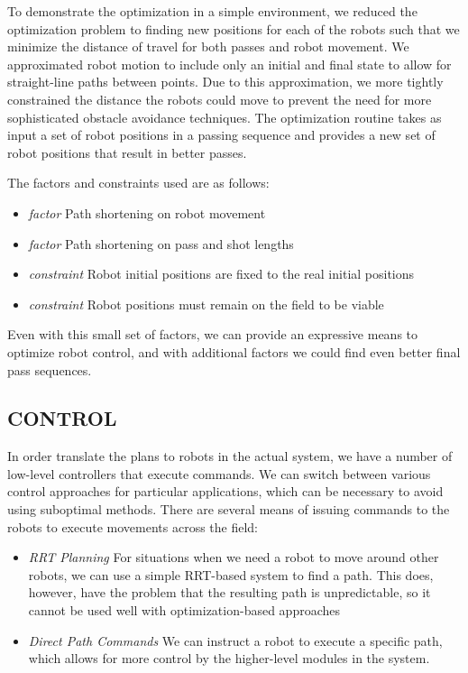 \documentclass[a4paper, 10pt, conference]{ieeeconf}      %
\begin{document}
To demonstrate the optimization in a simple environment, we reduced the optimization problem to finding new positions for each of the robots such that we minimize the distance of travel for both passes and robot movement.  We approximated robot motion to include only an initial and final state to allow for straight-line paths between points.  Due to this approximation, we more tightly constrained the distance the robots could move to prevent the need for more sophisticated obstacle avoidance techniques.  The optimization routine takes as input a set of robot positions in a passing sequence and provides a new set of robot positions that result in better passes.  

The factors and constraints used are as follows:
\begin{itemize}
 \item \textit{factor} Path shortening on robot movement
 \item \textit{factor} Path shortening on pass and shot lengths
 \item \textit{constraint} Robot initial positions are fixed to the real initial positions
 \item \textit{constraint} Robot positions must remain on the field to be viable
\end{itemize}

Even with this small set of factors, we can provide an expressive means to optimize robot control, and with additional factors we could find even better final pass sequences.  

\subsection{CONTROL}
In order translate the plans to robots in the actual system, we have a number of low-level controllers that execute commands. We can switch between various control approaches for particular applications, which can be necessary to avoid using suboptimal methods.  There are several means of issuing commands to the robots to execute movements across the field:
\begin{itemize}
 \item \textit{RRT Planning} For situations when we need a robot to move around other robots, we can use a simple RRT-based system to find a path.  This does, however, have the problem that the resulting path is unpredictable, so it cannot be used well with optimization-based approaches
 \item \textit{Direct Path Commands} We can instruct a robot to execute a specific path, which allows for more control by the higher-level modules in the system.  
 \end{itemize}
\end{document}
